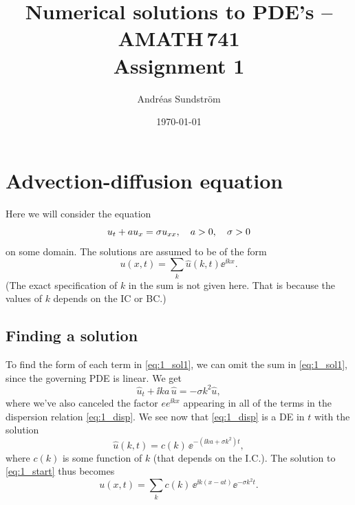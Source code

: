 \documentclass[11pt,letter, swedish, english
]{article}
\begin{document}

\title{Numerical solutions to PDE's -- AMATH\,741 \\
Assignment 1}
\author{Andréas Sundström}
\date{\today}

\maketitle


\section{Advection-diffusion equation}

Here we will consider the equation
\begin{equation}\label{eq:1_start}
u_t+au_x=\sigma u_{xx}\qcomma
a>0\qcomma \sigma>0
\end{equation}
on some domain.
The solutions are assumed to be of the form
\begin{equation}\label{eq:1_sol1}
u(x, t)=\sum_k \hat{u}(k, t)\ee^{\ii kx}.
\end{equation}
(The exact specification of $k$ in the sum is not given here. That is
because the values of $k$ depends on the IC or BC.)

\subsection{Finding a solution}
To find the form of each term in \eqref{eq:1_sol1}, we can omit the
sum in \eqref{eq:1_sol1}, since the governing PDE is linear. We get
\begin{equation}\label{eq:1_disp}
\hat{u}_t + \ii ka\, \hat{u}
=-\sigma k^2\hat{u},
\end{equation}
where we've also canceled the factor $ee^{\ii kx}$ appearing in all of
the terms in the dispersion relation \eqref{eq:1_disp}. We see now
that \eqref{eq:1_disp} is a DE in $t$ with the solution
\begin{equation}
\hat{u}(k, t)= c(k)\, \ee^{-(\ii ka+\sigma k^2)t},
\end{equation}
where $c(k)$ is some function of $k$ (that depends on the I.C.).
The solution to \eqref{eq:1_start} thus becomes
\begin{equation}\label{eq:1_sol2}
u(x, t) = \sum_k c(k)\, \ee^{\ii k(x-at)}\ee^{-\sigma k^2t}.
\end{equation}
\end{document}

